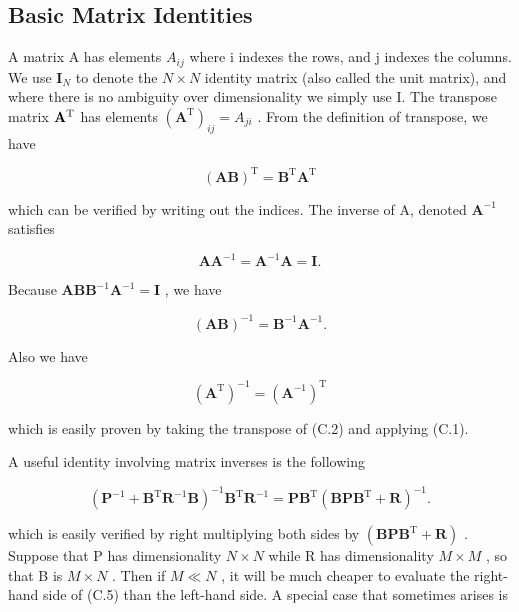 \documentclass[
  10
]{article}
\begin{document}
\subsection{Basic Matrix Identities}\label{basic-matrix-identities}

A matrix A has elements \(A _ { i j }\) where i indexes the rows, and j
indexes the columns. We use \({ \mathbf { I } } _ { N }\) to denote the
\(N \times N\) identity matrix (also called the unit matrix), and where
there is no ambiguity over dimensionality we simply use I. The transpose
matrix \({ \bf A } ^ { \mathrm { T } }\) has elements
\(( \mathbf { A } ^ { \mathrm { T } } ) _ { i j } = A _ { j i }\) . From
the definition of transpose, we have

\[
(\mathbf {A B}) ^ {\mathrm{T}} = \mathbf {B} ^ {\mathrm{T}} \mathbf {A} ^ {\mathrm{T}}\tag{C.1}
\]

which can be verified by writing out the indices. The inverse of A,
denoted \(\mathbf { A } ^ { - 1 }\) satisfies

\[
\mathbf {A} \mathbf {A} ^ {- 1} = \mathbf {A} ^ {- 1} \mathbf {A} = \mathbf {I}.\tag{C.2}
\]

Because
\(\mathbf { A } \mathbf { B } \mathbf { B } ^ { - 1 } \mathbf { A } ^ { - 1 } = \mathbf { I }\)
, we have

\[
(\mathbf {A B}) ^ {- 1} = \mathbf {B} ^ {- 1} \mathbf {A} ^ {- 1}.\tag{C.3}
\]

Also we have

\[
\left(\mathbf {A} ^ {\mathrm{T}}\right) ^ {- 1} = \left(\mathbf {A} ^ {- 1}\right) ^ {\mathrm{T}}\tag{C.4}
\]

which is easily proven by taking the transpose of (C.2) and applying
(C.1).

A useful identity involving matrix inverses is the following

\[
(\mathbf {P} ^ {- 1} + \mathbf {B} ^ {\mathrm{T}} \mathbf {R} ^ {- 1} \mathbf {B}) ^ {- 1} \mathbf {B} ^ {\mathrm{T}} \mathbf {R} ^ {- 1} = \mathbf {P B} ^ {\mathrm{T}} (\mathbf {B P B} ^ {\mathrm{T}} + \mathbf {R}) ^ {- 1}.\tag{C.5}
\]

which is easily verified by right multiplying both sides by
\(( \mathbf { B P B ^ { \mathrm { T } } + R } )\) . Suppose that P has
dimensionality \(N \times N\) while R has dimensionality \(M \times M\)
, so that B is \(M \times N\) . Then if \(M \ll N\) , it will be much
cheaper to evaluate the right-hand side of (C.5) than the left-hand
side. A special case that sometimes arises is
\end{document}
